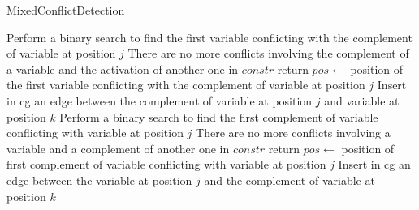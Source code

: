 \documentclass[preprint,12pt]{elsarticle}
\begin{document}
\begin{algorithm}\label{algMixConfDetection}
\caption{MixedConflictDetection}
{
	Perform a binary search to find the first variable conflicting with the complement of variable at position $j$\;
	{
		There are no more conflicts involving the complement of a variable and the activation of another one in $constr$\;
		return\;
	}
	$pos \gets$ position of the first variable conflicting with the complement of variable at position $j$\;
	{
		Insert in cg an edge between the complement of variable at position $j$ and variable at position $k$\;
	}
}
{
	Perform a binary search to find the first complement of variable conflicting with variable at position $j$\;
	{
		There are no more conflicts involving a variable and a complement of another one in $constr$\;
		return\;
	}
	$pos \gets$ position of first complement of variable conflicting with variable at position $j$\;
	{
		Insert in cg an edge between the variable at position $j$ and the complement of variable at position $k$\;
	}
}
\end{algorithm}
\end{document}
